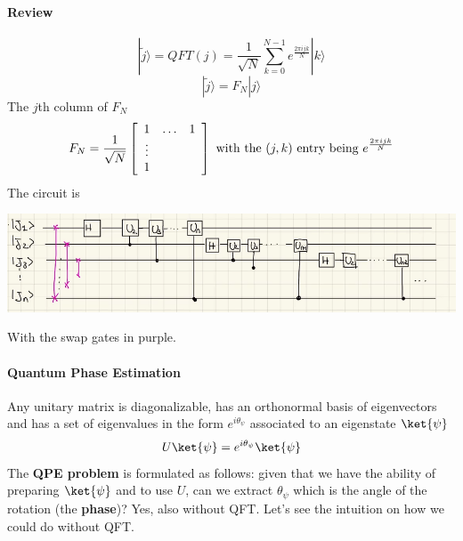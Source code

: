 \documentclass[10pt]{report}
\begin{document}
\paragraph{Review}
$$|\tilde{j}\rangle = QFT(j) = \frac{1}{\sqrt{N}}\sum_{k=0}^{N-1}e^{\frac{2\pi ijk}{N}}|k\rangle$$
$$|\tilde{j}\rangle = F_N|j\rangle$$
The $j$th column of $F_N$
$$F_N=\frac{1}{\sqrt{N}}\left[\begin{array}{c c c}
1&\ldots&1\\
\vdots& &\\
1
\end{array}\right]\hbox{ with the }(j,k)\hbox{ entry being }e^{\frac{2\pi ijk}{N}}$$
The circuit is

\begin{center}
	\includegraphics[scale=0.5]{26.png}
\end{center}
With the swap gates in purple.
\paragraph{Quantum Phase Estimation} Any unitary matrix is diagonalizable, has an orthonormal basis of eigenvectors and has a set of eigenvalues in the form $e^{i\theta_\psi}$ associated to an eigenstate $\ket{\psi}$
$$U\ket{\psi} = e^{i\theta_\psi}\ket{\psi}$$
The \textbf{QPE problem} is formulated as follows: given that we have the ability of preparing $\ket{\psi}$ and to use $U$, can we extract $\theta_\psi$ which is the angle of the rotation (the \textbf{phase})? Yes, also without QFT. Let's see the intuition on how we could do without QFT.
\end{document}
